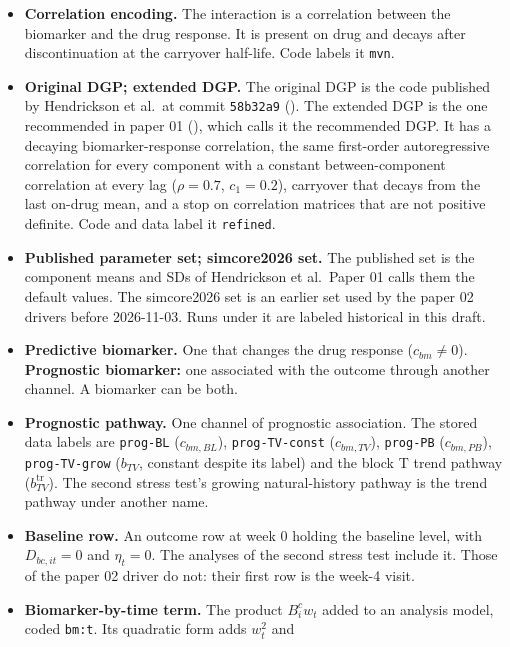 \documentclass[
  11pt,
]{article}
\providecommand{\tightlist}{%
  \setlength{\itemsep}{0pt}\setlength{\parskip}{0pt}}
\begin{document}
\begin{itemize}
\tightlist
\item
  \textbf{Correlation encoding.} The interaction is a correlation between
  the biomarker and the drug response. It is present on drug and
  decays after discontinuation at the carryover half-life. Code
  labels it \texttt{mvn}.
\item
  \textbf{Original DGP; extended DGP.} The original DGP is the code
  published by Hendrickson et al.~at commit \texttt{58b32a9}
  (). The extended DGP is the one recommended in
  paper 01 (), which calls it the recommended DGP.
  It has a decaying biomarker-response
  correlation, the same first-order autoregressive correlation for
  every component with a constant between-component correlation at
  every lag (\(\rho = 0.7\), \(c_1 = 0.2\)), carryover that decays from
  the last on-drug mean, and a stop on correlation matrices that are
  not positive definite. Code and data label it \texttt{refined}.
\item
  \textbf{Published parameter set; simcore2026 set.} The published set is
  the component means and SDs of Hendrickson et al.~Paper 01 calls
  them the default values. The simcore2026
  set is an earlier set used by the paper 02 drivers before
  2026-11-03. Runs under it are labeled historical in this draft.
\item
  \textbf{Predictive biomarker.} One that changes the drug response
  (\(c_{bm} \ne 0\)). \textbf{Prognostic biomarker:} one associated with the
  outcome through another channel. A biomarker can be both.
\item
  \textbf{Prognostic pathway.} One channel of prognostic association. The
  stored data labels are \texttt{prog-BL} (\(c_{bm,BL}\)), \texttt{prog-TV-const}
  (\(c_{bm,TV}\)), \texttt{prog-PB} (\(c_{bm,PB}\)), \texttt{prog-TV-grow} (\(b_{TV}\),
  constant despite its label) and the block T trend pathway
  (\(b_{TV}^{\mathrm{tr}}\)). The second stress test's growing
  natural-history pathway is the trend pathway under another name.
\item
  \textbf{Baseline row.} An outcome row at week 0 holding the baseline
  level, with \(D_{bc,it} = 0\) and \(\eta_t = 0\). The analyses of the
  second stress test include it. Those of the paper 02 driver do not:
  their first row is the week-4 visit.
\item
  \textbf{Biomarker-by-time term.} The product \(B^c_i w_t\) added to an
  analysis model, coded \texttt{bm:t}. Its quadratic form adds \(w_t^2\) and

\end{itemize}
\end{document}
